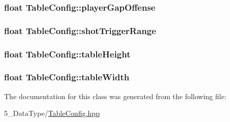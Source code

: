 \subsubsection[{\texorpdfstring{player\+Gap\+Offense}{playerGapOffense}}]{\setlength{\rightskip}{0pt plus 5cm}float Table\+Config\+::player\+Gap\+Offense}\hypertarget{class_table_config_a8788da31ad50cf733c0d20cb091cf6e9}{}\label{class_table_config_a8788da31ad50cf733c0d20cb091cf6e9}
\subsubsection[{\texorpdfstring{shot\+Trigger\+Range}{shotTriggerRange}}]{\setlength{\rightskip}{0pt plus 5cm}float Table\+Config\+::shot\+Trigger\+Range}\hypertarget{class_table_config_abbcfb5107f992ebfc458d4123a2fc490}{}\label{class_table_config_abbcfb5107f992ebfc458d4123a2fc490}
\subsubsection[{\texorpdfstring{table\+Height}{tableHeight}}]{\setlength{\rightskip}{0pt plus 5cm}float Table\+Config\+::table\+Height}\hypertarget{class_table_config_a8234f8b9c9f4c28e87e5f0cc5d4cff0f}{}\label{class_table_config_a8234f8b9c9f4c28e87e5f0cc5d4cff0f}
\subsubsection[{\texorpdfstring{table\+Width}{tableWidth}}]{\setlength{\rightskip}{0pt plus 5cm}float Table\+Config\+::table\+Width}\hypertarget{class_table_config_a1a38ba8277209a5e9b87b49c5291260b}{}\label{class_table_config_a1a38ba8277209a5e9b87b49c5291260b}


The documentation for this class was generated from the following file\+:\begin{DoxyCompactItemize}
\item 
5\+\_\+\+Data\+Type/\hyperlink{_table_config_8hpp}{Table\+Config.\+hpp}\end{DoxyCompactItemize}
